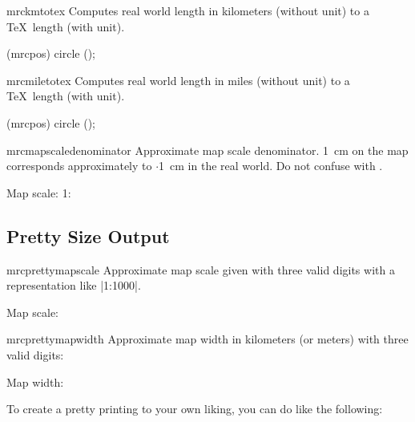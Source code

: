 \begin{docCommand}{mrckmtotex}{}
  Computes real world length  in kilometers (without unit)
  to a \TeX\ length (with unit).
  \begin{dispListing}
  \draw (mrcpos) circle ();
  \end{dispListing}
\end{docCommand}

\begin{docCommand}{mrcmiletotex}{}
  Computes real world length  in miles (without unit)
  to a \TeX\ length (with unit).
  \begin{dispListing}
  \draw (mrcpos) circle ();
  \end{dispListing}
\end{docCommand}

\begin{docCommand}{mrcmapscaledenominator}{}
  Approximate map scale denominator.
  \SI{1}{cm} on the map corresponds approximately to
  \mbox{$\cdot$\SI{1}{cm}} in the real world.
  Do not confuse with .
  \begin{dispListing}
  Map scale: 1:\mrcmapscaledenominator
  \end{dispListing}
\end{docCommand}


\subsection{Pretty Size Output}


\begin{docCommand}{mrcprettymapscale}{}
  Approximate map scale given with three valid digits
  with a representation like |1:1000|.
  \begin{dispListing}
  Map scale: \mrcprettymapscale
  \end{dispListing}
\end{docCommand}

\begin{docCommand}{mrcprettymapwidth}{}
  Approximate map width in kilometers (or meters) with three valid digits:
  \begin{dispListing}
  Map width: \mrcprettymapwidth
  \end{dispListing}
  To create a pretty printing to your own liking, you can do like the
  following:
  \begin{dispListing}
  \newcommand{\myprettymapwidth}{\SI[round-mode=figures,round-precision=3]%
    {\mrctextokm{\mrctexwidth}}{km}}
  \end{dispListing}
\end{docCommand}

